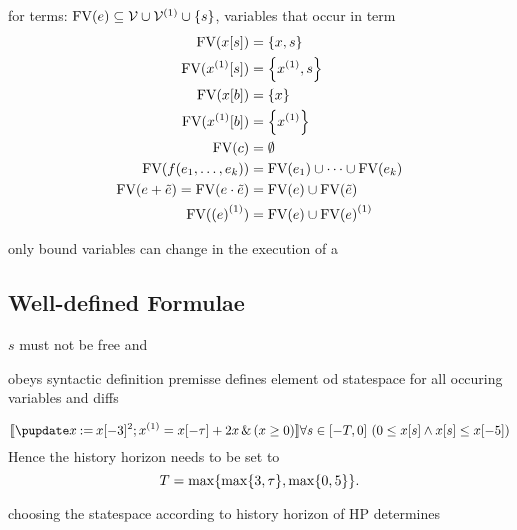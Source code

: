         \begin{definition}
            for terms: $\freevars{\astrm}\subseteq\allvars\cup\diffvars\cup\set{s}$, variables that occur in term
            \begin{align*}
                \freevars{\xtau[s]} &= \set{x,s}\\
                \freevars{\Dxtau[s]} &= \set{\D{x},s}\\
                \freevars{\xtau[b]} &= \set{x}\\
                \freevars{\Dxtau[b]} &= \set{\D{x}}\\
                \freevars{c} &= \emptyset\\
                \freevars{f(\range{\istrm{1}}{\istrm{k}})} &= \freevars{\istrm{1}} \cup\cdots\cup \freevars{\istrm{k}}\\
                \freevars{\astrm + \bstrm} = \freevars{\astrm \cdot \bstrm} &= \freevars{\astrm}\cup\freevars{\bstrm}\\
                \freevars{\D{(\astrm)}} &= \freevars{\astrm}\cup\D{\freevars{\astrm}}
            \end{align*}
                
        \end{definition} 

        only bound variables can change in the execution of a \HP   

    \subsection{Well-defined Formulae}
        \label{sec:well-definedness}
    
        $s$ must not be free
        and

        \begin{definition}
            obeys syntactic definition
            premisse defines element od statespace for all occuring variables and diffs
        \end{definition}

        \begin{example}
            \begin{equation*}
                \dbox{\hupdate{\humod{x}{\xtau[-3]^2}};\hevolvein{\D{x}=\xtau+2x}{(x\geq 0)}}{\holdssinceclosed{T}{0\leq \xtau[s] \land \xtau[s]\leq\xtau[-5]}}
            \end{equation*}
            Hence the history horizon needs to be set to
            \begin{equation*}
                T=\max\set{\max\set{3,\tau},\max\set{0,5}}.
            \end{equation*}
        \end{example}

        \begin{lemma}
            choosing the statespace according to history horizon of HP determines
        \end{lemma}

        \begin{example}
            
        \end{example}

